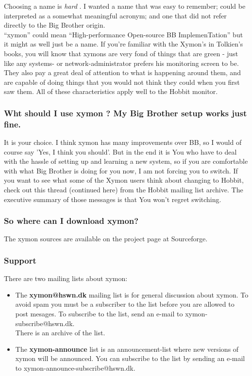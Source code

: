  Choosing a name is \emph{hard}
. I wanted a name that was easy to remember; could be interpreted as a somewhat meaningful acronym; and one that did not refer directly to the Big Brother origin.\\ 
 ``xymon'' could mean ``High-performance Open-source BB ImplemenTation'' but it might as well just be a name. If you're familiar with the Xymon's in Tolkien's books, you will know that xymons are very fond of things that are green - just like any systems- or network-administrator prefers his monitoring screen to be. They also pay a great deal of attention to what is happening around them, and are capable of doing things that you would not think they could when you first saw them. All of these characteristics apply well to the Hobbit monitor. 
\subsubsection{Wht should I use xymon ? My Big Brother setup works just fine.}


 It is your choice. I think xymon has many improvements over BB, so I would of course say 'Yes, I think you should'. But in the end it is You who have to deal with the hassle of setting up and learning a new system, so if you are comfortable with what Big Brother is doing for you now, I am not forcing you to switch. If you want to see what some of the Xymon users think about changing to Hobbit, check out this thread (continued here) from the Hobbit mailing list archive. The executive summary of those messages is that You won't regret switching.
\subsubsection{So where can I download xymon?}


 The xymon sources are available on the project page at Sourceforge.
\subsubsection{Support}


 There are two mailing lists about xymon: \begin{itemize}
\item The \textbf{xymon@hswn.dk}
 mailing list is for general discussion about xymon. To avoid spam you must be a subscriber to the list before you are allowed to post mesages. To subscribe to the list, send an e-mail to xymon-subscribe@hswn.dk.\\ 
 There is an archive of the list.
\item The \textbf{xymon-announce}
 list is an announcement-list where new versions of xymon will be announced. You can subscribe to the list by sending an e-mail to xymon-announce-subscribe@hswn.dk.

\end{itemize}



